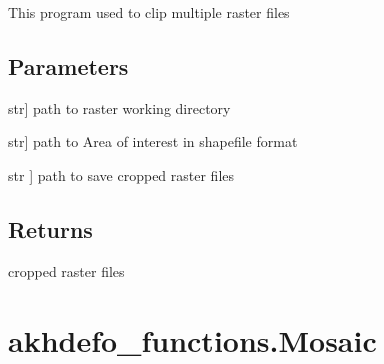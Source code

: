 \documentclass[letterpaper,10pt]{sphinxmanual}
\begin{document}
\begin{fulllineitems}
\label{\detokenize{generated/akhdefo_functions.Crop_to_AOI:akhdefo_functions.Crop_to_AOI}}
\pysigstartsignatures
{}
\pysigstopsignatures
\sphinxAtStartPar
This program used to clip multiple  raster files


\section{Parameters}
\label{\detokenize{generated/akhdefo_functions.Crop_to_AOI:parameters}}\begin{description}
\sphinxlineitem{Path\_to\_WorkingDir}{[}str{]}
\sphinxAtStartPar
path to raster working directory

\sphinxlineitem{Path\_to\_AOI\_shapefile}{[}str{]}
\sphinxAtStartPar
path to Area of interest in shapefile format

\sphinxlineitem{output\_CroppedDir}{[}str {]}
\sphinxAtStartPar
path to save cropped raster files

\end{description}


\section{Returns}
\label{\detokenize{generated/akhdefo_functions.Crop_to_AOI:returns}}
\sphinxAtStartPar
cropped raster files

\end{fulllineitems}


\sphinxstepscope


\chapter{akhdefo\_functions.Mosaic}
\label{\detokenize{generated/akhdefo_functions.Mosaic:akhdefo-functions-mosaic}}\label{\detokenize{generated/akhdefo_functions.Mosaic::doc}}
\end{document}

